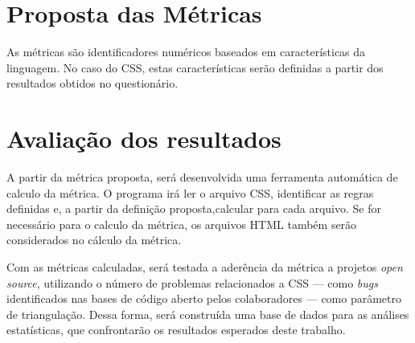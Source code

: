 \section{Proposta das Métricas}

As métricas são identificadores numéricos baseados em características da linguagem. No caso do CSS, estas características serão definidas a partir dos resultados obtidos no questionário.

\section{Avaliação dos resultados}

A partir da métrica proposta, será desenvolvida uma ferramenta automática de calculo da métrica. O programa irá ler o arquivo CSS, identificar as regras definidas e, a partir da definição proposta,calcular para cada arquivo. Se for necessário para o calculo da métrica, os arquivos HTML também serão considerados no cálculo da métrica.

Com as métricas calculadas, será testada a aderência da métrica a projetos \textit{open source}, utilizando o número de problemas relacionados a CSS --- como \textit{bugs} identificados nas bases de código aberto pelos colaboradores ---  como parâmetro de triangulação. Dessa forma, será construída uma base de dados para as análises estatísticas, que confrontarão os resultados esperados deste trabalho.
